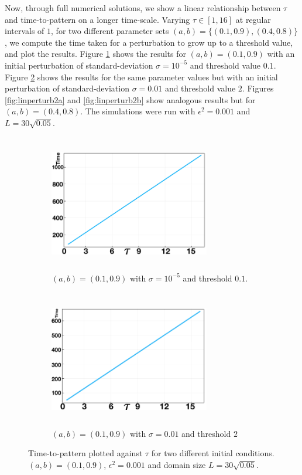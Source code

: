 Now, through full numerical solutions, we show a linear relationship between $\tau$ and time-to-pattern on a longer time-scale. Varying $\tau\in[1,16]$ at regular intervals of $1$, for two different parameter sets $(a,b)=\{(0.1,0.9),(0.4,0.8)\}$, we compute the time taken for a perturbation to grow up to a threshold value, and plot the results. Figure \ref{fig:linperturb1a} shows the results for $(a,b)=(0.1,0.9)$ with an initial perturbation of standard-deviation $\sigma=10^{-5}$ and threshold value $0.1$. Figure \ref{fig:linperturb1b} shows the results for the same parameter values but with an initial perturbation of standard-deviation $\sigma=0.01$ and threshold value $2$. Figures \ref{fig:linperturb2a} and \ref{fig:linperturb2b} show analogous results but for $(a,b)=(0.4,0.8)$. The simulations were run with $\epsilon^2=0.001$ and $L=30\sqrt{0.05}$.
\begin{figure}[H]
    \centering
    \begin{subfigure}[b]{0.45\textwidth}
        \centering
        \includegraphics[width=7cm,height=6cm]{longlin2.png}
        \caption{$(a,b)=(0.1,0.9)$ with $\sigma=10^{-5}$ and threshold $0.1$.}
        \label{fig:linperturb1a}
    \end{subfigure}
    \hfill
    \begin{subfigure}[b]{0.45\textwidth}
        \centering
        \includegraphics[width=7cm,height=6cm]{longlin1.png}
        \caption{$(a,b)=(0.1,0.9)$ with $\sigma=0.01$ and threshold $2$}
        \label{fig:linperturb1b}
    \end{subfigure}
    \caption{Time-to-pattern plotted against $\tau$ for two different initial conditions. $(a,b)=(0.1,0.9)$, $\epsilon^2=0.001$ and domain size $L=30\sqrt{0.05}$.}
    \label{}
\end{figure}

